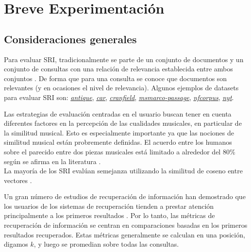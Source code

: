 \chapter{Breve Experimentación}
\label{chap:experiment}

\section{Consideraciones generales}
\label{sec:consid}
Para evaluar SRI, tradicionalmente se parte de un conjunto de documentos y un conjunto de consultas con una relación de relevancia establecida entre ambos conjuntos \cite{manning2008introductiontoIR}. De forma que para una consulta se conoce que documentos son relevantes (y en ocasiones el nivel de relevancia). Algunos ejemplos de datasets para evaluar SRI son: \href{https://ir-datasets.com/antique.html}{\textit{antique}}, \href{https://ir-datasets.com/car.html}{\textit{car}}, \href{https://ir-datasets.com/cranfield.html}{\textit{cranfield}}, \href{https://ir-datasets.com/msmarco-passage.html}{\textit{msmarco-passage}}, \href{https://ir-datasets.com/nfcorpus.html}{\textit{nfcorpus}}, \href{https://ir-datasets.com/nyt.html}{\textit{nyt}}.

Las estrategias de evaluación centradas en el usuario buscan tener en cuenta diferentes factores en la percepción de las cualidades musicales, en particular de la similitud musical. Esto es especialmente importante ya que las nociones de similitud musical están probremente definidas. El acuerdo entre los humanos sobre el parecido entre dos piezas musicales está limitado a alrededor del 80\% según se afirma en la literatura \cite{Schedl2014MusicIR}.\\
La mayoría de los SRI evalúan semejanza utilizando la similitud de coseno entre vectores \cite{Brundha2022VectorMB}.

Un gran número de estudios de recuperación de información han demostrado que los usuarios de los sistemas de recuperación tienden a prestar atención principalmente a los primeros resultados \cite{Mitra2017NeuralMF}. Por lo tanto, las métricas de recuperación de información se centran en comparaciones basadas en los primeros resultados recuperados. Estas métricas generalmente se calculan en una posición, digamos $k$, y luego se promedian sobre todas las consultas.

